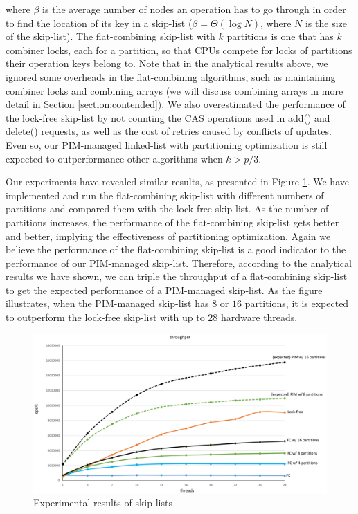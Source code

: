 \documentclass[11pt, letterpaper]{article}   	%
\begin{document}
where $\beta$ is the average number of nodes an operation has to go through
in order to find the location of its key in a skip-list
($\beta = \Theta(\log N)$, where $N$ is the size of the skip-list).
The flat-combining skip-list with $k$ partitions is one that has $k$ combiner locks,
each for a partition, so that CPUs compete for locks of partitions their operation
keys belong to.
Note that in the analytical results above, we ignored some overheads in the flat-combining
algorithms, such as maintaining combiner locks and combining arrays
(we will discuss combining arrays in more detail in Section \ref{section:contended}).
We also overestimated the performance of the lock-free skip-list by not counting the
CAS operations used in add() and delete() requests, as well as the cost of retries
caused by conflicts of updates.
Even so, our PIM-managed linked-list with partitioning optimization is
still expected to outperformance other algorithms when $k > p/3$.

Our experiments have revealed similar results, 
as presented in Figure \ref{figure:skiplist_data}.
We have implemented and run the flat-combining skip-list with different numbers of
partitions and compared them with the lock-free skip-list.
As the number of partitions increases, the performance of the flat-combining skip-list
gets better and better, implying the effectiveness of partitioning optimization.
Again we believe the performance of the flat-combining skip-list is a good indicator
to the performance of our PIM-managed skip-list.
Therefore, according to the analytical results we have shown, we can triple the throughput
of a flat-combining skip-list to get the expected performance of a PIM-managed skip-list.
As the figure illustrates, when the PIM-managed skip-list has $8$ or $16$ partitions,
it is expected to outperform the lock-free skip-list with up to 28 hardware threads.

\begin{figure}[ht!]
\centering
\includegraphics[width=.8\linewidth]{skiplist_data.eps}
\caption{Experimental results of skip-lists}
\label{figure:skiplist_data}
\end{figure}
\end{document}
